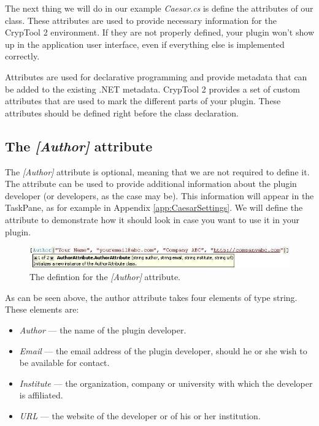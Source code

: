 The next thing we will do in our example \textit{Caesar.cs} is define the attributes of our class. These attributes are used to provide necessary information for the CrypTool 2 environment. If they are not properly defined, your plugin won't show up in the application user interface, even if everything else is implemented correctly.

Attributes are used for declarative programming and provide metadata that can be added to the existing .NET metadata. CrypTool 2 provides a set of custom attributes that are used to mark the different parts of your plugin. These attributes should be defined right before the class declaration.

\subsection{The \protect\textit{[Author]} attribute}
\label{sec:TheAuthorAttribute}

The \textit{[Author]} attribute is optional, meaning that we are not required to define it. The attribute can be used to provide additional information about the plugin developer (or developers, as the case may be). This information will appear in the TaskPane, as for example in Appendix \ref{app:CaesarSettings}. We will define the attribute to demonstrate how it should look in case you want to use it in your plugin.

\begin{figure}[h!]
	\centering
		\includegraphics[width=.90\textwidth]{figures/attribute_author.jpg}
	\caption{The defintion for the \textit{[Author]} attribute.}
	\label{fig:attribute_author}
\end{figure}

As can be seen above, the author attribute takes four elements of type string. These elements are:

\begin{itemize}
	\item \textit{Author} --- the name of the plugin developer.
	\item \textit{Email} --- the email address of the plugin developer, should he or she wish to be available for contact.
	\item \textit{Institute} --- the organization, company or university with which the developer is affiliated.
	\item \textit{URL} --- the website of the developer or of his or her institution.
\end{itemize}


